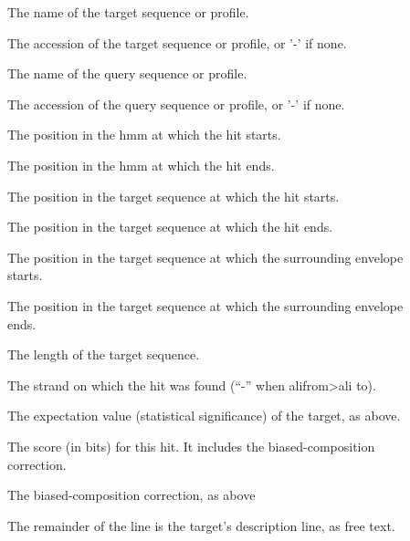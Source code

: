 \begin{description}
\item[]
  The name of the target sequence or profile. 

\item[]
  The accession of the target sequence or profile, or '-' if none.

\item[] 
  The name of the query sequence or profile.

\item[]
  The accession of the query sequence or profile, or '-' if none.

\item[]
  The position in the hmm at which the hit starts.

\item[]
  The position in the hmm at which the hit ends.

\item[]
  The position in the target sequence at which the hit starts.

\item[]
  The position in the target sequence at which the hit ends.

\item[]
  The position in the target sequence at which the surrounding envelope starts.

\item[]
  The position in the target sequence at which the surrounding envelope ends.

\item[]
  The length of the target sequence.

\item[]
  The strand on which the hit was found (``-'' when alifrom>ali to).
  
\item[] The expectation value
  (statistical significance) of the target, as above.

\item[] 
  The score (in bits) for this hit. It includes the biased-composition 
  correction. 

\item[] The biased-composition
  correction, as above

\item[] 
  The remainder of the line is the target's description line, as free text.
\end{description}


